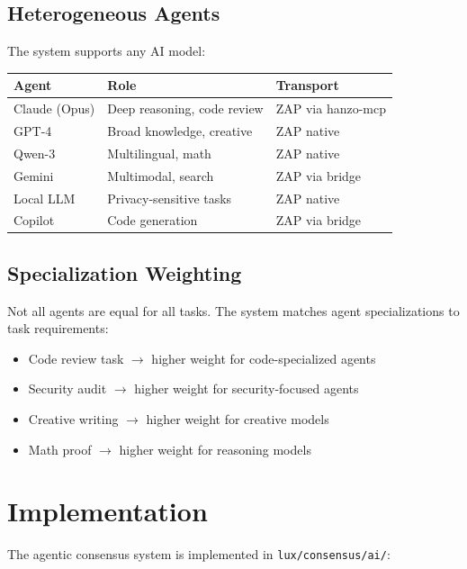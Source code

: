 \documentclass[11pt,a4paper]{article}
\begin{document}
\subsection{Heterogeneous Agents}

The system supports any AI model:

\begin{center}
\begin{tabular}{lll}
\toprule
\textbf{Agent} & \textbf{Role} & \textbf{Transport} \\
\midrule
Claude (Opus) & Deep reasoning, code review & ZAP via hanzo-mcp \\
GPT-4 & Broad knowledge, creative & ZAP native \\
Qwen-3 & Multilingual, math & ZAP native \\
Gemini & Multimodal, search & ZAP via bridge \\
Local LLM & Privacy-sensitive tasks & ZAP native \\
Copilot & Code generation & ZAP via bridge \\
\bottomrule
\end{tabular}
\end{center}

\subsection{Specialization Weighting}

Not all agents are equal for all tasks. The system matches agent specializations to task requirements:

\begin{itemize}[leftmargin=2em]
\item Code review task $\to$ higher weight for code-specialized agents
\item Security audit $\to$ higher weight for security-focused agents
\item Creative writing $\to$ higher weight for creative models
\item Math proof $\to$ higher weight for reasoning models
\end{itemize}

\section{Implementation}

The agentic consensus system is implemented in \texttt{lux/consensus/ai/}:
\end{document}
